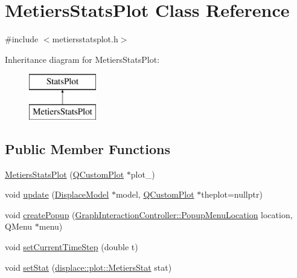 \hypertarget{class_metiers_stats_plot}{}\section{Metiers\+Stats\+Plot Class Reference}
\label{class_metiers_stats_plot}


{\ttfamily \#include $<$metiersstatsplot.\+h$>$}

Inheritance diagram for Metiers\+Stats\+Plot\+:\begin{figure}[H]
\begin{center}
\leavevmode
\includegraphics[height=2.000000cm]{d0/d56/class_metiers_stats_plot}
\end{center}
\end{figure}
\subsection*{Public Member Functions}
\begin{DoxyCompactItemize}
\item 
\mbox{\hyperlink{class_metiers_stats_plot_add1fd1a36fec21be99965219fce2574d}{Metiers\+Stats\+Plot}} (\mbox{\hyperlink{class_q_custom_plot}{Q\+Custom\+Plot}} $\ast$plot\+\_\+)
\item 
void \mbox{\hyperlink{class_metiers_stats_plot_a05dc9db5dc0dc3aff2eff1f724a42eb0}{update}} (\mbox{\hyperlink{class_displace_model}{Displace\+Model}} $\ast$model, \mbox{\hyperlink{class_q_custom_plot}{Q\+Custom\+Plot}} $\ast$theplot=nullptr)
\item 
void \mbox{\hyperlink{class_metiers_stats_plot_aa6c7ae8d2e437f4d1d4054c72ad2a951}{create\+Popup}} (\mbox{\hyperlink{class_graph_interaction_controller_a67e6eba082927bf2b984bed54fe32764}{Graph\+Interaction\+Controller\+::\+Popup\+Menu\+Location}} location, Q\+Menu $\ast$menu)
\item 
void \mbox{\hyperlink{class_metiers_stats_plot_acf1640eeb5ee3cf66133ef8fcc14dd59}{set\+Current\+Time\+Step}} (double t)
\item 
void \mbox{\hyperlink{class_metiers_stats_plot_aa9c87da98cf92938f5aca7358304e8b7}{set\+Stat}} (\mbox{\hyperlink{namespacedisplace_1_1plot_a673bbc813b7f03be3dc76ae7fd087516}{displace\+::plot\+::\+Metiers\+Stat}} stat)
\end{DoxyCompactItemize}

